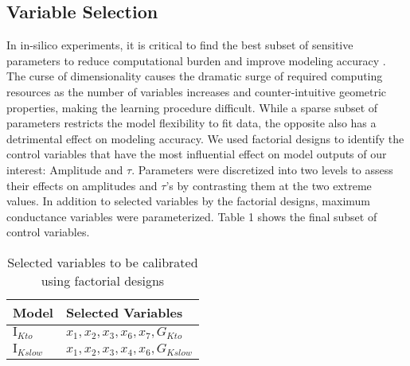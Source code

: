 \documentclass[journal]{IEEEtran}
\begin{document}
\subsection{Variable Selection}
In in-silico experiments, it is critical to find the best subset of sensitive parameters to reduce computational burden and improve modeling accuracy \cite{verleysen2005curse}. The curse of dimensionality causes the dramatic surge of required computing resources as the number of variables increases and counter-intuitive geometric properties, making the learning procedure difficult. While a sparse subset of parameters restricts the model flexibility to fit data, the opposite also has a detrimental effect on modeling accuracy. We used factorial designs to identify the control variables that have the most influential effect on model outputs of our interest: Amplitude and $\tau$. Parameters were discretized into two levels to assess their effects on amplitudes and $\tau$'s by contrasting them at the two extreme values. In addition to selected variables by the factorial designs, maximum conductance variables were parameterized. Table 1 shows the final subset of control variables.

\begin{table}
    \caption{Selected variables to be calibrated using factorial designs}
    \label{table1}
    \centering
    \begin{tabular}{ll}
        \toprule
        Model & Selected Variables  \\ 
        \hline
        $\text{I}_{Kto}$ & $x_1, x_2, x_3, x_6, x_7, G_{Kto}$ \\
        $\text{I}_{Kslow}$ & $x_1, x_2, x_3, x_4, x_6, G_{Kslow}$ \\
        \bottomrule
    \end{tabular}
\end{table}
\end{document}
